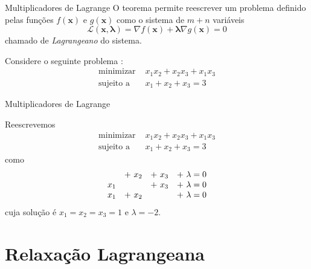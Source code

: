 \documentclass[brazil, MathSerif, aspectratio = 169]{beamer}
\begin{document}
\begin{frame}{Multiplicadores de Lagrange}
    O teorema permite reescrever um problema definido pelas funções $f(\mathbf{x})$ e $g(\mathbf{x})$ como o sistema de $m + n$ variáveis
        $$\mathcal{L}(\mathbf{x}, \pmb{\lambda}) = \nabla f(\mathbf{x}) + \pmb{\lambda} \nabla g(\mathbf{x}) = 0 $$
    chamado de \emph{Lagrangeano} do sistema.
    \begin{example}
        Considere o seguinte problema \cite{luenberger:2008}:
        \begin{align*}
            \text{minimizar } &x_1 x_2 + x_2 x_3 + x_1 x_3 \\
            \text{sujeito a } &x_1 + x_2 + x_3 = 3
        \end{align*}


    \end{example}
\end{frame}

\begin{frame}{Multiplicadores de Lagrange}
    \begin{example}
        Reescrevemos
        \begin{align*}
            \text{minimizar } &x_1 x_2 + x_2 x_3 + x_1 x_3 \\
            \text{sujeito a } &x_1 + x_2 + x_3 = 3
        \end{align*}
        como
        $$\begin{array}[]{@{}cccc@{}}
            \phantom{x_1} &+\,\, x_2 &+\,\, x_3 &+\,\, \lambda = 0 \\
            x_1 &\phantom{+\,\, x_2} &+\,\, x_3 &+\,\, \lambda = 0 \\
            x_1 &+\,\, x_2 &\phantom{+\,\, x_3} &+\,\, \lambda = 0
        \end{array}$$
        cuja solução é $x_1 = x_2 = x_3 = 1$ e $\lambda = -2$.
    \end{example}
\end{frame}

\section{Relaxação Lagrangeana}
\end{document}
